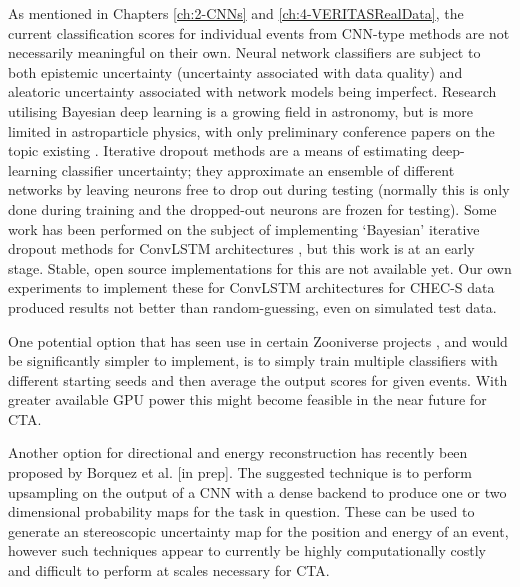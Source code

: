 As mentioned in Chapters \ref{ch:2-CNNs} and \ref{ch:4-VERITASRealData}, the current classification scores for individual events from CNN-type methods are not necessarily meaningful on their own. Neural network classifiers are subject to both epistemic uncertainty (uncertainty associated with data quality) and aleatoric uncertainty associated with network models being imperfect. Research utilising Bayesian deep learning is a growing field in astronomy, but is more limited in astroparticle physics, with only preliminary conference papers on the topic existing \cite{bayesianwcd}. Iterative dropout methods are a means of estimating deep-learning classifier uncertainty; they approximate an ensemble of different networks by leaving neurons free to drop out during testing (normally this is only done during training and the dropped-out neurons are frozen for testing). Some work has been performed on the subject of implementing `Bayesian' iterative dropout methods for ConvLSTM architectures \cite{bayesconv},  but this work is at an early stage. Stable, open source implementations for this are not available yet.  Our own experiments to implement these for ConvLSTM architectures for CHEC-S data produced results not better than random-guessing, even on simulated test data.

One potential option that has seen use in certain Zooniverse projects \cite{mike}, and would be significantly simpler to implement, is to simply train multiple classifiers with different starting seeds and then average the output scores for given events. With greater available GPU power this might become feasible in the near future for CTA.

Another option for directional and energy reconstruction has recently been proposed by Borquez et al. [in prep]. The suggested technique is to perform upsampling on the output of a CNN with a dense backend to produce one or two dimensional probability maps for the task in question. These can be used to generate an stereoscopic uncertainty map for the position and energy of an event, however such techniques appear to currently be highly computationally costly and difficult to perform at scales necessary for CTA.

